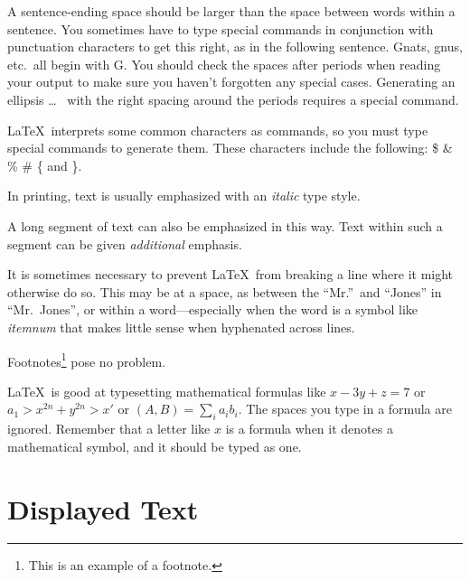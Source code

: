 \documentclass{article}      %
\newcommand{\ip}[2]{(#1, #2)}
\begin{document}
A sentence-ending space should be larger than the
space between words within a sentence.  You
sometimes have to type special commands in
conjunction with punctuation characters to get
this right, as in the following sentence.
Gnats, gnus, etc.\ all  %
begin with G\@.         %
You should check the spaces after periods when
reading your output to make sure you haven't
forgotten any special cases.  Generating an
ellipsis
\ldots\               %
%
%
with the right spacing around the periods requires
a special command.

\LaTeX\ interprets some common characters as
commands, so you must type special commands to
generate them.  These characters include the
following:
\$ \& \% \# \{ and \}.

In printing, text is usually emphasized with an
\emph{italic}
type style.

\begin{em}
       A long segment of text can also be emphasized
       in this way.  Text within such a segment can be
       given \emph{additional} emphasis.
\end{em}

It is sometimes necessary to prevent \LaTeX\ from
breaking a line where it might otherwise do so.
This may be at a space, as between the ``Mr.''\ and
``Jones'' in
``Mr.~Jones'',        %
or within a word---especially when the word is a
symbol like
\mbox{\emph{itemnum}}
that makes little sense when hyphenated across
lines.

Footnotes\footnote{This is an example of a footnote.}
pose no problem.

\LaTeX\ is good at typesetting mathematical formulas
like
\( x-3y + z = 7 \)
or
\( a_{1} > x^{2n} + y^{2n} > x' \)
or
\( \ip{A}{B} = \sum_{i} a_{i} b_{i} \).
The spaces you type in a formula are
ignored.  Remember that a letter like
$x$                   %
is a formula when it denotes a mathematical
symbol, and it should be typed as one.

\section{Displayed Text}
\end{document}
